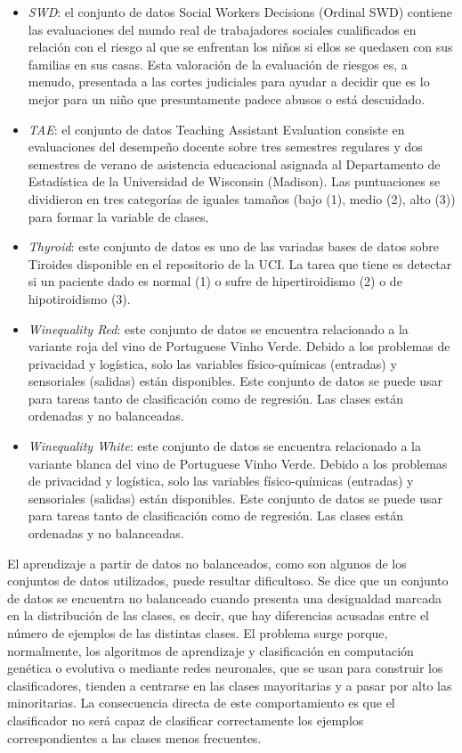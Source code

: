 \begin{itemize}
				\item \textit{SWD}: el conjunto de datos Social Workers Decisions (Ordinal SWD) contiene las evaluaciones del mundo real de trabajadores sociales cualificados en relación con el riesgo al que se enfrentan los niños si ellos se quedasen con sus familias en sus casas. Esta valoración de la evaluación de riesgos es, a menudo, presentada a las cortes judiciales para ayudar a decidir que es lo mejor para un niño que presuntamente padece abusos o está descuidado.
				\item \textit{TAE}: el conjunto de datos Teaching Assistant Evaluation consiste en evaluaciones del desempeño docente sobre tres semestres regulares y dos semestres de verano de asistencia educacional asignada al Departamento de Estadística de la Universidad de Wisconsin (Madison). Las puntuaciones se dividieron en tres categorías de iguales tamaños (bajo (1), medio (2), alto (3)) para formar la variable de clases.
				\item \textit{Thyroid}: este conjunto de datos es uno de las variadas bases de datos sobre Tiroides disponible en el repositorio de la UCI. La tarea que tiene es detectar si un paciente dado es normal (1) o sufre de hipertiroidismo (2) o de hipotiroidismo (3).
				\item \textit{Winequality Red}: este conjunto de datos se encuentra relacionado a la variante roja del vino de Portuguese Vinho Verde. Debido a los problemas de privacidad y logística, solo las variables físico-químicas (entradas) y sensoriales (salidas) están disponibles. Este conjunto de datos se puede usar para tareas tanto de clasificación como de regresión. Las clases están ordenadas y no balanceadas.
				\item \textit{Winequality White}: este conjunto de datos se encuentra relacionado a la variante blanca del vino de Portuguese Vinho Verde. Debido a los problemas de privacidad y logística, solo las variables físico-químicas (entradas) y sensoriales (salidas) están disponibles. Este conjunto de datos se puede usar para tareas tanto de clasificación como de regresión. Las clases están ordenadas y no balanceadas.
			\end{itemize}
			
			El aprendizaje a partir de datos no balanceados, como son algunos de los conjuntos de datos utilizados, puede resultar dificultoso. Se dice que un conjunto de datos se encuentra no balanceado cuando presenta una desigualdad marcada en la distribución de las clases, es decir, que hay diferencias acusadas entre el número de ejemplos de las distintas clases. El problema surge porque, normalmente, los algoritmos de aprendizaje y clasificación en computación genética o evolutiva o mediante redes neuronales, que se usan para construir los clasificadores, tienden a centrarse en las clases mayoritarias y a pasar por alto las minoritarias. La consecuencia directa de este comportamiento es que el clasificador no será capaz de clasificar correctamente los ejemplos correspondientes a las clases menos frecuentes.\\
			
